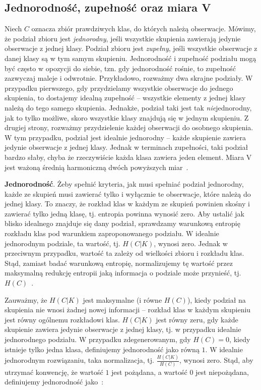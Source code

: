\documentclass{praca1}
\begin{document}
\subsection{Jednorodność, zupełność oraz miara V}

Niech $C$ oznacza zbiór prawdziwych klas, do których należą obserwacje. Mówimy, że podział zbioru jest \emph{jednorodny}, jeśli wszystkie skupienia zawierają jedynie obserwacje z jednej klasy. Podział zbioru jest \emph{zupełny}, jeśli wszystkie obserwacje z danej klasy są w tym samym skupieniu. Jednorodność i zupełność podziału mogą być często w opozycji do siebie, tzn. gdy jednorodność rośnie, to zupełność zazwyczaj maleje i odwrotnie. Przykładowo, rozważmy dwa skrajne podziały. W przypadku pierwszego, gdy przydzielamy wszystkie obserwacje do jednego skupienia, to dostajemy idealną zupełność -- wszystkie elementy z jednej klasy należą do tego samego skupienia. Jednakże, podział taki jest tak \emph{nie}jednorodny, jak to tylko możliwe, skoro wszystkie klasy znajdują się w jednym skupieniu. Z drugiej strony, rozważmy przydzielenie każdej obserwacji do osobnego skupienia. W tym przypadku, podział jest idealnie jednorodny -- każde skupienie zawiera jedynie obserwacje z jednej klasy. Jednak w terminach zupełności, taki podział bardzo słaby, chyba że rzeczywiście każda klasa zawiera jeden element. Miara $\textrm{V}$ jest ważoną średnią harmoniczną dwóch powyższych miar~\cite{Rosenberg2007:vmeasure}.


\textbf{Jednorodność}. Żeby spełnić kryteria, jak musi spełniać podział jednorodny, każde ze skupień musi zawierać tylko i wyłącznie te obserwacje, które należą do jednej klasy. To znaczy, że rozkład klas w każdym ze skupień powinien skośny i zawierać tylko jedną klasę, tj. entropia powinna wynosić zero. Aby ustalić jak blisko idealnego znajduje się dany podział, sprawdzamy warunkową entropię rozkładu klas pod warunkiem zaproponowanego podziału. W idealnie jednorodnym podziale, ta wartość, tj. $H(C|K)$, wynosi zero. Jednak w przeciwnym przypadku, wartość ta zależy od wielkości zbioru i rozkładu klas. Stąd, zamiast badać warunkową entropię, normalizujemy tę wartość przez maksymalną redukcję entropii jaką informacja o podziale może przynieść, tj. $H(C)$~\cite{Rosenberg2007:vmeasure}.

Zauważmy, że $H(C|K)$ jest maksymalne (i równe $H(C)$), kiedy podział na skupienia nie wnosi żadnej nowej informacji -- rozkład klas w każdym skupieniu jest równy ogólnemu rozkładowi klas. $H(C|K)$ jest równy zeru, gdy każde skupienie zawiera jedynie obserwacje z jednej klasy, tj. w przypadku idealnie jednorodnego podziału. W przypadku zdegenerowanym, gdy $H(C) = 0$, kiedy istnieje tylko jedna klasa, definiujemy jednorodność jako równą $1$. W idealnie jednorodnym rozwiązaniu, taka normalizacja, tj. $\frac{H(C|K)}{H(C)}$, wynosi zero. Stąd, aby utrzymać konwencję, że wartość $1$ jest pożądana, a wartość $0$ jest niepożądana, definiujemy jednorodność jako~\cite{Rosenberg2007:vmeasure}:
\end{document}
